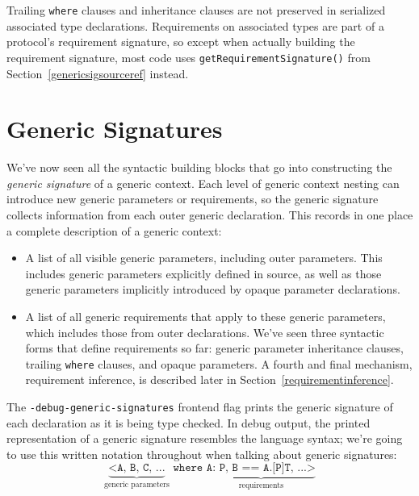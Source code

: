 \documentclass[a4paper,headsepline,bibliography=totoc,toc=flat,fleqn,twoside=semi]{scrbook}
\theoremstyle{definition}
\theoremstyle{definition}
\theoremstyle{definition}
\begin{document}
Trailing \texttt{where} clauses and inheritance clauses are not preserved in serialized associated type declarations. Requirements on associated types are part of a protocol's requirement signature, so except when actually building the requirement signature, most code uses \texttt{getRequirementSignature()} from Section~\ref{genericsigsourceref} instead.

\chapter{Generic Signatures}\label{genericsig}

We've now seen all the syntactic building blocks that go into constructing the \emph{generic signature} of a generic context. Each level of generic context nesting can introduce new generic parameters or requirements, so the generic signature collects information from each outer generic declaration. This records in one place a complete description of a generic context:
\begin{itemize}
\item A list of all visible generic parameters, including outer parameters. This includes generic parameters explicitly defined in source, as well as those generic parameters implicitly introduced by opaque parameter declarations.
\item A list of all generic requirements that apply to these generic parameters, which includes those from outer declarations. We've seen three syntactic forms that define requirements so far: generic parameter inheritance clauses, trailing \texttt{where} clauses, and opaque parameters. A fourth and final mechanism, requirement inference, is described later in Section~\ref{requirementinference}.
\end{itemize}
The \texttt{-debug-generic-signatures} frontend flag prints the generic signature of each declaration as it is being type checked. In debug output, the printed representation of a generic signature resembles the language syntax; we're going to use this written notation throughout when talking about generic signatures:
\[\underbrace{\texttt{<A, B, C, ...}}_{\text{generic parameters}}\texttt{ where }\underbrace{\texttt{A:\ P, B == A.[P]T, ...>}}_{\text{requirements}}\]
\end{document}

